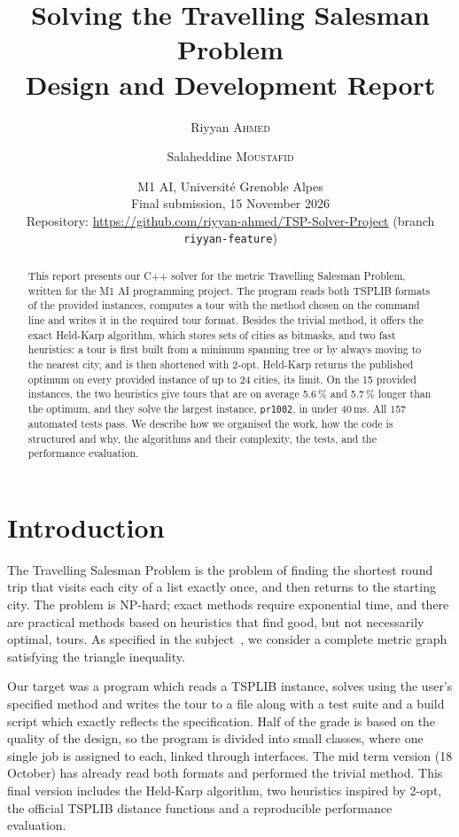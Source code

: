\documentclass[10pt,a4paper]{article}
\title{\vspace{-1.5cm}Solving the Travelling Salesman Problem\\[0.3em]\large Design and Development Report}
\author{Riyyan \textsc{Ahmed} \and Salaheddine \textsc{Moustafid}}
\date{M1 AI, Universit\'e Grenoble Alpes\\
Final submission, 15 November 2026\\[0.4em]
\small Repository: \url{https://github.com/riyyan-ahmed/TSP-Solver-Project} (branch \texttt{riyyan-feature})}
\makeatletter
\let\tsp@section\section
\renewcommand{\section}{\FloatBarrier\tsp@section}
\makeatother
\begin{document}
\maketitle

\begin{abstract}
This report presents our C++ solver for the metric Travelling Salesman Problem, written for the M1 AI programming project. The program reads both TSPLIB formats of the provided instances, computes a tour with the method chosen on the command line and writes it in the required tour format. Besides the trivial method, it offers the exact Held-Karp algorithm, which stores sets of cities as bitmasks, and two fast heuristics: a tour is first built from a minimum spanning tree or by always moving to the nearest city, and is then shortened with 2-opt. Held-Karp returns the published optimum on every provided instance of up to 24 cities, its limit. On the 15 provided instances, the two heuristics give tours that are on average 5.6\,\% and 5.7\,\% longer than the optimum, and they solve the largest instance, \texttt{pr1002}, in under 40\,ms. All 157 automated tests pass. We describe how we organised the work, how the code is structured and why, the algorithms and their complexity, the tests, and the performance evaluation.
\end{abstract}

\section{Introduction}

The Travelling Salesman Problem is the problem of finding the shortest round trip that visits each city of a list exactly once, and then returns to the starting city. The problem is NP-hard; exact methods require exponential time, and there are practical methods based on heuristics that find good, but not necessarily optimal, tours. As specified in the subject~\cite{subject}, we consider a complete metric graph satisfying the triangle inequality.

Our target was a program which reads a TSPLIB instance, solves using the user's specified method and writes the tour to a file along with a test suite and a build script which exactly reflects the specification. Half of the grade is based on the quality of the design, so the program is divided into small classes, where one single job is assigned to each, linked through interfaces. The mid term version (18 October) has already read both formats and performed the trivial method. This final version includes the Held-Karp algorithm, two heuristics inspired by 2-opt, the official TSPLIB distance functions and a reproducible performance evaluation.
\end{document}
